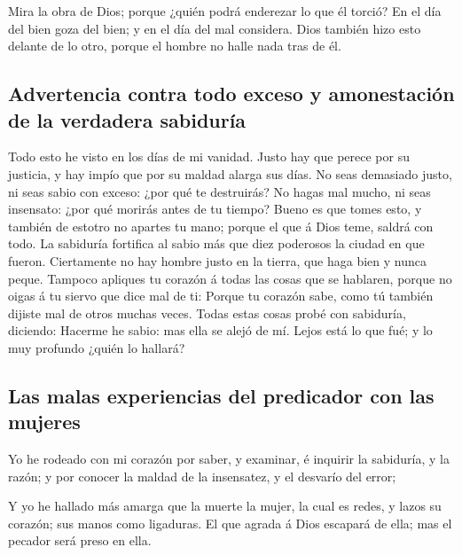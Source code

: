  Mira la obra de Dios; porque ¿quién podrá enderezar lo
que él torció?  En el día del bien goza del bien; y en el
día del mal considera. Dios también hizo esto delante de lo otro, porque
el hombre no halle nada tras de él.

\hypertarget{advertencia-contra-todo-exceso-y-amonestaciuxf3n-de-la-verdadera-sabiduruxeda}{%
\subsection{Advertencia contra todo exceso y amonestación de la
verdadera
sabiduría}\label{advertencia-contra-todo-exceso-y-amonestaciuxf3n-de-la-verdadera-sabiduruxeda}}

 Todo esto he visto en los días de mi vanidad. Justo hay
que perece por su justicia, y hay impío que por su maldad alarga sus
días.  No seas demasiado justo, ni seas sabio con exceso:
¿por qué te destruirás?  No hagas mal mucho, ni seas
insensato: ¿por qué morirás antes de tu tiempo?  Bueno es
que tomes esto, y también de estotro no apartes tu mano; porque el que á
Dios teme, saldrá con todo.  La sabiduría fortifica al
sabio más que diez poderosos la ciudad en que fueron. 
Ciertamente no hay hombre justo en la tierra, que haga bien y nunca
peque.  Tampoco apliques tu corazón á todas las cosas que
se hablaren, porque no oigas á tu siervo que dice mal de ti:
 Porque tu corazón sabe, como tú también dijiste mal de
otros muchas veces.  Todas estas cosas probé con
sabiduría, diciendo: Hacerme he sabio: mas ella se alejó de mí.
 Lejos está lo que fué; y lo muy profundo ¿quién lo
hallará?

\hypertarget{las-malas-experiencias-del-predicador-con-las-mujeres}{%
\subsection{Las malas experiencias del predicador con las
mujeres}\label{las-malas-experiencias-del-predicador-con-las-mujeres}}

 Yo he rodeado con mi corazón por saber, y examinar, é
inquirir la sabiduría, y la razón; y por conocer la maldad de la
insensatez, y el desvarío del error;

 Y yo he hallado más amarga que la muerte la mujer, la
cual es redes, y lazos su corazón; sus manos como ligaduras. El que
agrada á Dios escapará de ella; mas el pecador será preso en ella.

